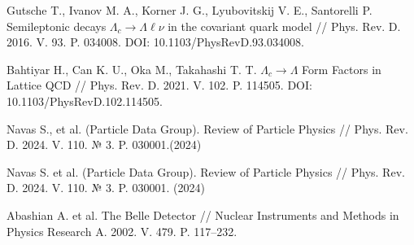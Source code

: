 \begin{thebibliography}{99}
    Gutsche T., Ivanov M. A., Korner J. G., Lyubovitskij V. E., Santorelli P. Semileptonic decays $\Lambda_c \to \Lambda \ell \nu$ in the covariant quark model // Phys. Rev. D. 2016. V. 93. P. 034008. DOI: 10.1103/PhysRevD.93.034008.    
    
    Bahtiyar H., Can K. U., Oka M., Takahashi T. T. $\Lambda_c \to \Lambda$ Form Factors in Lattice QCD // Phys. Rev. D. 2021. V. 102. P. 114505. DOI: 10.1103/PhysRevD.102.114505.    

    Navas S., et al. (Particle Data Group). Review of Particle Physics // Phys. Rev. D. 2024. V. 110. $№$ 3. P. 030001.(2024)
    
    Navas S. et al. (Particle Data Group). Review of Particle Physics // Phys. Rev. D. 2024. V. 110. № 3. P. 030001. (2024)

    Abashian A. et al. The Belle Detector // Nuclear Instruments and Methods in Physics Research A. 2002. V. 479. P. 117–232.
    


\end{thebibliography}
